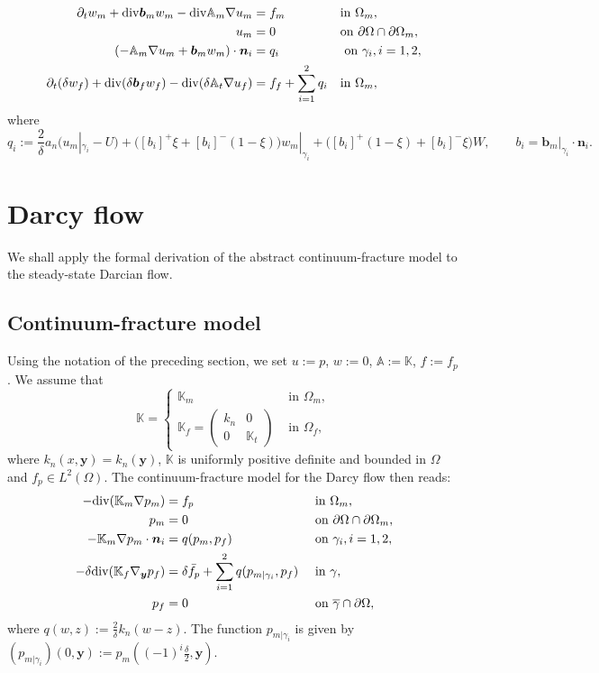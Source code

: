 \documentclass[a4paper]{article}
\def\prtl{\partial}
\def\vc#1{\mathbf{\boldsymbol{#1}}}     %
\def\tn#1{{\mathbb{#1}}}    %
\def\div{{\rm div}}
\def\grad{\nabla}
\def\yy{{\vc y}}
\begin{document}
\begin{align}
  \label{eq:fr:continuity}
  \prtl_t w_m + \div \vc b_m w_m - \div \tn A_m \grad u_m &= f_m&&  \text{in } \Omega_m,\\
  \label{eq:fr:Dirichlet}
  u_m &= 0&& \text{on } \partial\Omega\cap\partial\Omega_m,\\
  (- \tn A_m\grad u_m + \vc b_m w_m) \cdot \vc n_i &= q_i &&\mbox{ on }\gamma_i,i=1,2,\\ 
  \prtl_t(\delta w_f)  + \div(\delta \vc b_f w_f ) - \div( \delta \tn A_t \grad u_f) 
      &= f_f + \sum_{i=1}^2 q_i&&  \text{in } \Omega_m,\\
\end{align}
where 
\[
    q_i:=\frac2\delta a_n(u_m|_{\gamma_i} - U) 
    +  \big([b_i]^{+}\xi + [b_i]^{-}(1-\xi)\big) w_m|_{\gamma_i}
    +  \big([b_i]^{+}(1-\xi) + [b_i]^{-}\xi\big) W,
    \qquad b_i = \vc b_m |_{\gamma_i} \cdot \vc n_i.
\]



\section{Darcy flow}

We shall apply the formal derivation of the abstract continuum-fracture model to the steady-state Darcian flow.

\subsection{Continuum-fracture model}

Using the notation of the preceding section, we set $u:=p$, $w:=0$, $\tn A:=\tn K$, $f:=f_p$.
We assume that
\[ \tn K = \begin{cases}\tn K_m & \mbox{ in }\Omega_m,\\ \tn K_f = \begin{pmatrix}k_n & 0\\0&\tn K_t\end{pmatrix} & \mbox{ in }\Omega_f,\end{cases} \]
where $k_n(x,\yy)=k_n(\yy)$, $\tn K$ is uniformly positive definite and bounded in $\Omega$ and $f_p\in L^2(\Omega)$.
The continuum-fracture model for the Darcy flow then reads:
\begin{subequations}
\label{eq:asymptotic_darcy}
\begin{align}
-\div(\tn K_m\nabla p_m) &= f_p &&\mbox{ in }\Omega_m,\\
p_m &= 0 &&\mbox{ on }\partial\Omega\cap\partial\Omega_m,\\
-\tn K_m\nabla p_m\cdot\vc n_i &= q(p_m,p_f) &&\mbox{ on }\gamma_i,i=1,2,\\
-\delta\div(\tn K_f\nabla_\yy p_f) &= \delta\bar f_p + \sum_{i=1}^2 q(p_{m|\gamma_i},p_f) &&\mbox{ in }\gamma,\\
p_f &= 0 &&\mbox{ on }\overline\gamma\cap\partial\Omega,
\end{align}
\end{subequations}
where $q(w,z):=\frac2\delta k_n(w-z)$.
The function $p_{m|\gamma_i}$ is given by $(p_{m|\gamma_i})(0,\yy):=p_m((-1)^i\frac\delta2,\yy)$.
\end{document}

